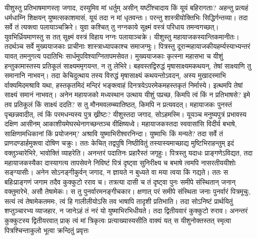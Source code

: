 \vakya यीशुस्तु प्रतिभाषमाणस्ता् जगाद, दस्युमिव मां धर्तुम् असीन् यष्टींश्चादाय किं यूयं बहिरागताः?
\vakya अहन्तु प्रत्यहं धर्मधाम्नि शिक्षयन् युष्मत्सकाशमासं, यूयं तदा न मां धृतवन्तः। परन्तु शास्त्रीयोक्तिभिः सिद्धिर्गन्तव्या।
\vakya तदा सर्वे तं त्यक्त्वा पलायाञ्चक्रिरे।
\vakya युवा कश्चित् तु नग्नकाये सूक्ष्मं वस्त्रं परिधाय तमन्वगच्छत्।
\vakya युवभिर्ध्रियमाणस्तु स तत् सूक्ष्मं वस्त्रं विहाय नग्नः पलायाञ्चक्रे।
\vakya यीशुस्तु महायाजकस्यान्तिकमानीतः। तदर्थञ्च सर्वे मुख्ययाजकाः प्राचीनाः शास्त्राध्यापकाश्च समाजग्मुः।
\vakya पित्रस्तु दूरान्महायाजकीयहर्म्यस्याभ्यन्तरं यावत् तमनुगत्य पदातिभिः सार्धमुपविश्याग्नितापमसेवत।
\vakya मुख्ययाजकाः कृत्स्ना महासभा च यीशुं हन्तुकामास्तस्य प्रतिकूलं साक्ष्यममृगयन्त, न तु लेभिरे।
\vakya बहवस्तद्विरुद्धं मृषासाक्ष्यमकथयन्, तेषां साक्ष्याणि तु समानानि नाभवन्।
\vakya तदा केचिदुत्थाय तस्य विरुद्धं मृषासाक्ष्यं कथयन्तोऽवदन्,
\vakya अस्य मुखादस्माभि र्वाक्यमिदमश्रावि यथा, हस्तकृतमिदं मन्दिरं भङ्क्त्वाहं दिनत्रयेऽपरमेकमहस्तकृतं निर्मास्ये।
\vakya इत्थमपि तेषां साक्ष्यं समानं नाभवत्।
\vakya अनेन महायजको मध्यस्थान उत्थाय यीशुं पप्रच्छ, किमपि त्वं किं न प्रतिभाषसे? इमे तव प्रतिकूलं किं साक्ष्यं ददति? स तु मौनमवलम्ब्यातिष्ठत्, किमपि न प्रत्यवदत्।
\vakya महायाजकः पुनस्तं पृच्छन्नवादीत्, त्वं किं परमधन्यस्य पुत्र ख्रीष्टः?
\vakya यीशुस्तदा जगाद, सोऽहमस्मि। यूयञ्च मनुष्यपुत्रं प्रभावस्य दक्षिण आसीनम् आकाशीयमेघरथेनागच्छन्तञ्च वीक्षिष्यध्वे।
\vakya महायाजकस्तदा स्ववासांसि विदीर्य बभाषे, साक्षिणामधिकानां किं प्रयोजनम्?
\vakya अश्रावि युष्माभिरीश्वरनिन्दा। युष्माभिः किं मन्यते? तदा सर्वे तं प्राणदण्डार्हमुक्त्वा दोषिण चक्रुः।
\vakya ततः केचित् तद्वपुषि निष्ठीवितुं तस्यास्यमाच्छाद्य मुष्टिभिराहन्तुम् इदं वक्तुञ्चारेभिरे, भावोक्तिं व्याहरेति। अनन्तरं पदातिनः प्रहारैस्तं जगृहुः।
\vakya पित्रस्तु यदाधः प्राङ्गणेऽविद्यत, तदा महायाजकस्यैका दास्यागत्य
\vakya तापसेवने निविष्टं पित्रं दृष्ट्वा सुनिरीक्ष्य च बभाषे त्वमपि नासरतीययीशोः सङ्ग्यासीः।
\vakya अनेन सोऽनङ्गीकुर्वन् जगाद, न ज्ञायते न बुध्यते वा मया त्वया किं गद्यते। ततः स बहिःप्राङ्गणं जगाम तदैव कुक्कुटो रराव च।
\vakya तत्रत्या दासी च तं दृष्ट्वा पुनः समीपे संस्थितान् जनान् वक्तुमारेभे, असौ तेषामेकः। स तु पुनर्वारमनङ्गीचकार।
\vakya क्षणात् परं समीपे संस्थिता जनाः पुनर्वारं पित्रमूचुः, सत्यं त्वं तेषामेकतममः, त्वं हि गालीलीयोऽसि तव भाषापि तादृशी प्रतिभाति।
\vakya तदा सोऽनिष्टं प्रार्थयितुं शप्तुञ्चारभ्य व्याजहार, न जानेऽहं तं नरं यो युष्माभिरभिधीयते।
\vakya तदा द्वितीयवारं कुक्कुटो रुराव। अनन्तरं कुक्कुटस्य द्वितीयरवात् प्राक् त्वं मां त्रिकृत्वः प्रत्याख्यास्यसीति वाक्यं यत् स यीशुनोक्तस्तत् स्मृत्वा पित्रश्चिन्ताकुलो भूत्वा क्रन्दितुं प्रवृत्तः\eoc